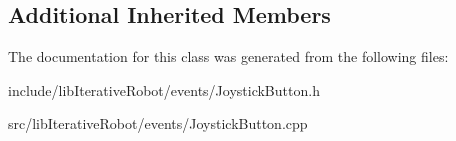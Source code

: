 \subsection*{Additional Inherited Members}


The documentation for this class was generated from the following files\+:\begin{DoxyCompactItemize}
\item 
include/lib\+Iterative\+Robot/events/Joystick\+Button.\+h\item 
src/lib\+Iterative\+Robot/events/Joystick\+Button.\+cpp\end{DoxyCompactItemize}

